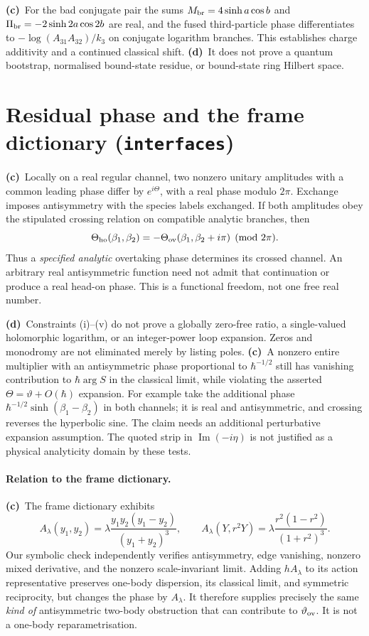 \documentclass[11pt,a4paper]{article}
\newcommand{\Lc}{\textbf{(c)}\ }
\newcommand{\Ld}{\textbf{(d)}\ }
\begin{document}
\Lc For the bad conjugate pair the sums
$M_{\rm br}=4\sinh a\cos b$ and
$\Pi_{\rm br}=-2\sinh2a\cos2b$ are real, and the fused third-particle
phase differentiates to $-\log(A_{31}A_{32})/k_3$ on conjugate logarithm
branches. This establishes charge additivity and a continued classical
shift. \Ld It does not prove a quantum bootstrap, normalised bound-state
residue, or bound-state ring Hilbert space.

\section{Residual phase and the frame dictionary (\texttt{interfaces})}
\Lc Locally on a real regular channel, two nonzero unitary amplitudes with a
common leading phase differ by $e^{i\Theta}$, with a real phase modulo
$2\pi$. Exchange imposes antisymmetry with the species labels exchanged.
If both amplitudes obey the stipulated crossing relation on compatible
analytic branches, then
\begin{equation}
 \Theta_{\rm ho}(\beta_1,\beta_2)
 =-\Theta_{\rm ov}(\beta_1,\beta_2+i\pi)\pmod{2\pi}.
\end{equation}
Thus a \emph{specified analytic} overtaking phase determines its crossed
channel. An arbitrary real antisymmetric function need not admit that
continuation or produce a real head-on phase. This is a functional freedom,
not one free real number.

\Ld Constraints (i)--(v) do not prove a globally zero-free ratio, a
single-valued holomorphic logarithm, or an integer-power loop expansion.
Zeros and monodromy are not eliminated merely by listing poles.
\Lc A nonzero entire multiplier with an antisymmetric phase proportional to
$\hbar^{-1/2}$ still has vanishing contribution to
$\hbar\arg S$ in the classical limit, while violating the asserted
$\Theta=\vartheta+O(\hbar)$ expansion. For example take the additional phase
$\hbar^{-1/2}\sinh(\beta_1-\beta_2)$ in both channels; it is real and
antisymmetric, and crossing reverses the hyperbolic sine. The claim needs an additional perturbative
expansion assumption. The quoted strip in $\operatorname{Im}(-i\eta)$
is not justified as a physical analyticity domain by these tests.

\paragraph{Relation to the frame dictionary.}
\Lc The frame dictionary exhibits
\begin{equation}
 A_\lambda(y_1,y_2)=\lambda\frac{y_1y_2(y_1-y_2)}{(y_1+y_2)^3},\qquad
 A_\lambda(Y,r^2Y)=\lambda\frac{r^2(1-r^2)}{(1+r^2)^3}.
\end{equation}
Our symbolic check independently verifies antisymmetry, edge vanishing,
nonzero mixed derivative, and the nonzero scale-invariant limit. Adding
$hA_\lambda$ to its action representative preserves one-body dispersion,
its classical limit, and symmetric reciprocity, but changes the phase by
$A_\lambda$. It therefore supplies precisely the same \emph{kind of}
antisymmetric two-body obstruction that can contribute to
$\vartheta_{\rm ov}$. It is not a one-body reparametrisation.
\end{document}
